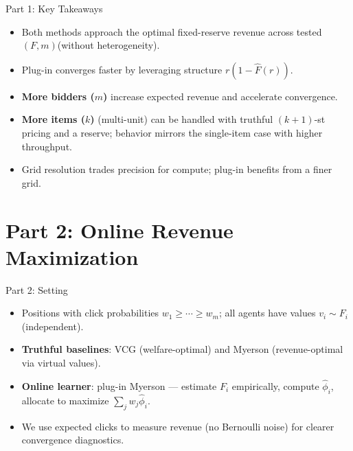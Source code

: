 \documentclass{beamer}
\begin{document}

\begin{frame}{Part 1: Key Takeaways}
  \begin{itemize}
    \item Both methods approach the optimal fixed-reserve revenue across tested $(F,m)$(without heterogeneity).
    \item Plug-in converges faster by leveraging structure $r(1-\hat F(r))$.
    \item \textbf{More bidders ($m$)} increase expected revenue and accelerate convergence.
    \item \textbf{More items ($k$)} (multi-unit) can be handled with truthful $(k{+}1)$-st pricing and a reserve; behavior mirrors the single-item case with higher throughput.
    \item Grid resolution trades precision for compute; plug-in benefits from a finer grid.
  \end{itemize}
\end{frame}

\section{Part 2: Online Revenue Maximization}

\begin{frame}{Part 2: Setting}
  \begin{itemize}
    \item Positions with click probabilities $w_1 \ge \cdots \ge w_m$; all agents have values $v_i \sim F_i$ (independent). \vspace{1mm}
    \item \textbf{Truthful baselines}: VCG (welfare-optimal) and Myerson (revenue-optimal via virtual values). \vspace{1mm}
    \item \textbf{Online learner}: plug-in Myerson — estimate $F_i$ empirically, compute $\hat{\phi}_i$, allocate to maximize $\sum_j w_j \hat{\phi}_i$. \vspace{1mm}
    \item We use expected clicks to measure revenue (no Bernoulli noise) for clearer convergence diagnostics.
  \end{itemize}
\end{frame}
\end{document}
